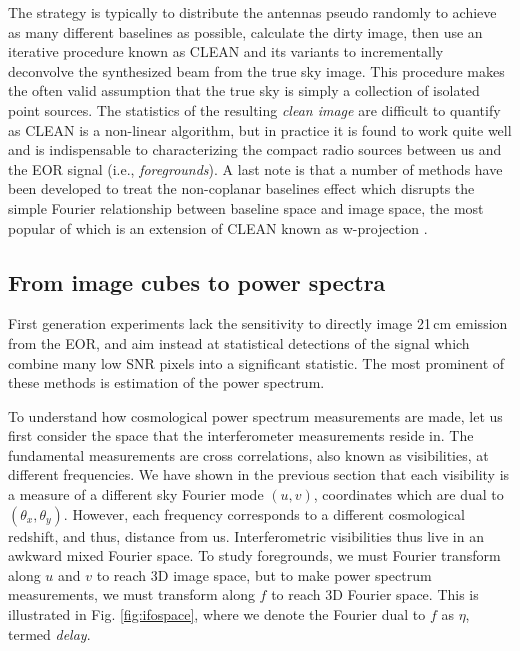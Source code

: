 {The strategy is typically to distribute the antennas pseudo randomly to achieve as many different baselines as possible, calculate the dirty image, then use an iterative procedure known as CLEAN \citep{hogbomclean} and its variants to incrementally deconvolve the synthesized beam from the true sky image. This procedure makes the often valid assumption that the true sky is simply a collection of isolated point sources. The statistics of the resulting \textit{clean image} are difficult to quantify as CLEAN is a non-linear algorithm, but in practice it is found to work quite well and is indispensable to characterizing the compact radio sources between us and the EOR signal (i.e., \textit{foregrounds}). A last note is that a number of methods have been developed to treat the non-coplanar baselines effect which disrupts the simple Fourier relationship between baseline space and image space, the most popular of which is an extension of CLEAN known as w-projection \citep{wproj}.


\subsection{From image cubes to power spectra}

First generation experiments lack the sensitivity to directly image 21\,cm emission from the EOR, and aim instead at statistical detections of the signal which combine many low SNR pixels into a significant statistic. The most prominent of these methods is estimation of the power spectrum.

To understand how cosmological power spectrum measurements are made, let us first consider the space that the interferometer measurements reside in. The fundamental measurements are cross correlations, also known as visibilities, at different frequencies. We have shown in the previous section that each visibility is a measure of a different sky Fourier mode $(u,v)$, coordinates which are dual to $(\theta_x,\theta_y)$. However, each frequency corresponds to a different cosmological redshift, and thus, distance from us. Interferometric visibilities thus live in an awkward mixed Fourier space. To study foregrounds, we must Fourier transform along $u$ and $v$ to reach 3D image space, but to make power spectrum measurements, we must transform along $f$ to reach 3D Fourier space. This is illustrated in Fig. \ref{fig:ifospace}, where we denote the Fourier dual to $f$ as $\eta$, termed \textit{delay}.

}
